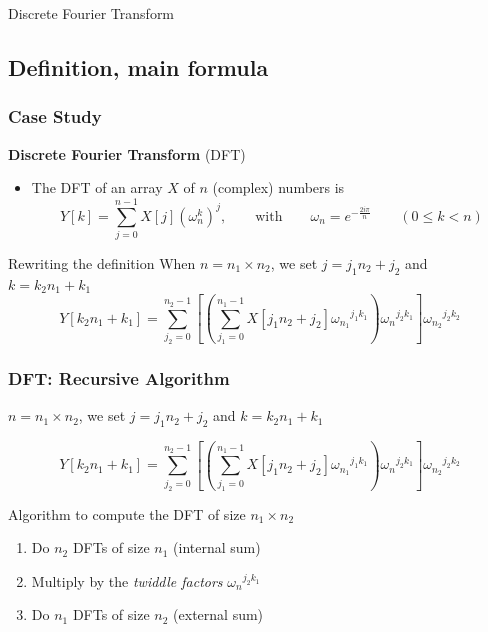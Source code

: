 \documentclass[xcolor={rgb,x11names,svgnames},rgb,x11names,svgnames]{beamer}
\begin{document}
\begin{frame}
  \centering
  \vfill
  \Huge Discrete Fourier Transform
  \vfill
\end{frame}


\subsection{Definition, main formula}
\begin{frame}[label=fftdef]
  \frametitle{Case Study}

  \begin{block}{\textbf{Discrete Fourier Transform} (DFT)}
  \begin{itemize}
  \item The DFT of an array $X$ of $n$ (complex) numbers is
\[
  Y[k] = \sum_{j=0}^{n-1} X[j] \left(\omega_n^{k}\right)^j, \qquad \text{with} \qquad \omega_n = e^{-\frac{2i\pi}{n}} \qquad (0 \leq k < n)
\]
\end{itemize}
\end{block}

\medskip

\begin{alertblock}{Rewriting the definition}
When $n = n_1 \times n_2$, we set
$j = j_1 n_2 + j_2$ and $k = k_2 n_1 + k_1$ 
\[
Y[k_2 n_1 + k_1] = \sum_{j_2 = 0}^{n_2 - 1} \left[ \left( \sum_{j_1 = 0}^{n_1 - 1} X[j_1n_2 + j_2] {\omega_{n_1}}^{j_1 k_1} \right) {\omega_n}^{j_2 k_1} \right] {\omega_{n_2}}^{j_2 k_2}
\]
\end{alertblock}

\end{frame}


\begin{frame}[label=fftdef]
  \frametitle{DFT: Recursive Algorithm}

$n = n_1 \times n_2$, we set $j = j_1 n_2 + j_2$ and $k = k_2 n_1 + k_1$ 

\[
Y[k_2 n_1 + k_1] = \sum_{j_2 = 0}^{n_2 - 1} \left[ \left( \sum_{j_1 = 0}^{n_1 - 1} X[j_1n_2 + j_2] {\omega_{n_1}}^{j_1 k_1} \right) {\omega_n}^{j_2 k_1} \right] {\omega_{n_2}}^{j_2 k_2}
\]
  
\begin{block}{Algorithm to compute the DFT of size $n_1 \times n_2$}
  \begin{enumerate}
  \item Do $n_2$ DFTs of size $n_1$ (internal sum)
  \item Multiply by the \emph{twiddle factors} ${\omega_n}^{j_2 k_1}$
  \item Do $n_1$ DFTs of size $n_2$ (external sum)
  \end{enumerate}
\end{block}
\end{frame}
\end{document}
